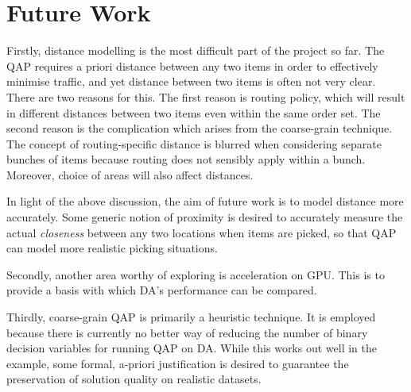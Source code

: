 \documentclass[hyp]{socreport}
\begin{document}
\section{Future Work}
Firstly, distance modelling is the most difficult part of the project so far. The QAP requires a priori distance between any two items in order to effectively minimise traffic, and yet distance between two items is often not very clear. There are two reasons for this. The first reason is routing policy, which will result in different distances between two items even within the same order set. The second reason is the complication which arises from the coarse-grain technique. The concept of routing-specific distance is blurred when considering separate bunches of items because routing does not sensibly apply within a bunch. Moreover, choice of areas will also affect distances.

In light of the above discussion, the aim of future work is to model distance more accurately. Some generic notion of proximity is desired to accurately measure the actual \textit{closeness} between any two locations when items are picked, so that QAP can model more realistic picking situations.

Secondly, another area worthy of exploring is acceleration on GPU. This is to provide a basis with which DA's performance can be compared.

Thirdly, coarse-grain QAP is primarily a heuristic technique. It is employed because there is currently no better way of reducing the number of binary decision variables for running QAP on DA. While this works out well in the example, some formal, a-priori justification is desired to guarantee the preservation of solution quality on realistic datasets.




\appendix
\end{document}
